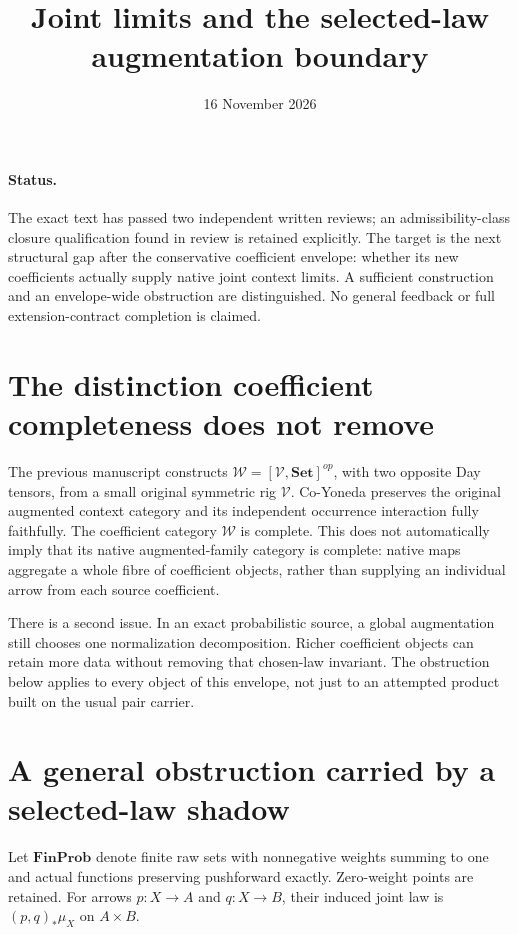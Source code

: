 \documentclass[11pt]{article}
\title{Joint limits and the selected-law augmentation boundary}
\date{16 November 2026}
\newcommand{\V}{\mathcal V}
\newcommand{\W}{\mathcal W}
\begin{document}
\maketitle
\paragraph{Status.} The exact text has passed two independent written reviews; an admissibility-class closure qualification found in review is retained explicitly. The target is the next structural gap after the conservative coefficient envelope: whether its new coefficients actually supply native joint context limits. A sufficient construction and an envelope-wide obstruction are distinguished. No general feedback or full extension-contract completion is claimed.

\section{The distinction coefficient completeness does not remove}
The previous manuscript constructs $\W=[\V,\mathbf{Set}]^{op}$, with two opposite Day tensors, from a small original symmetric rig $\V$. Co-Yoneda preserves the original augmented context category and its independent occurrence interaction fully faithfully. The coefficient category $\W$ is complete. This does not automatically imply that its native augmented-family category is complete: native maps aggregate a whole fibre of coefficient objects, rather than supplying an individual arrow from each source coefficient.

There is a second issue. In an exact probabilistic source, a global augmentation still chooses one normalization decomposition. Richer coefficient objects can retain more data without removing that chosen-law invariant. The obstruction below applies to every object of this envelope, not just to an attempted product built on the usual pair carrier.

\section{A general obstruction carried by a selected-law shadow}
Let $\mathbf{FinProb}$ denote finite raw sets with nonnegative weights summing to one and actual functions preserving pushforward exactly. Zero-weight points are retained. For arrows $p:X\to A$ and $q:X\to B$, their induced joint law is $(p,q)_*\mu_X$ on $A\times B$.
\end{document}

